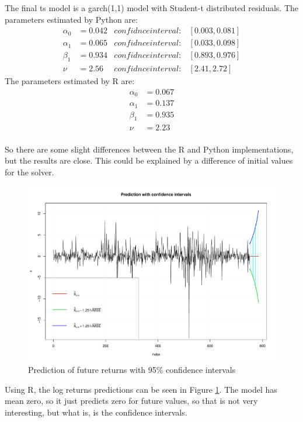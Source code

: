 The final \acrshort{ts} model is a \acrshort{garch}(1,1) model with Student-t distributed residuals. The parameters estimated by Python are:
\begin{align*}
\alpha_0 &= 0.042 & confidnce interval: & [0.003, 0.081] \\
\alpha_1 &= 0.065 & confidnce interval: & [0.033, 0.098]\\
\beta_1 &= 0.934 & confidnce interval: & [0.893, 0.976]\\
\nu &= 2.56 & confidnce interval: & [2.41, 2.72]
\end{align*}
The parameters estimated by R are:
\begin{align*}
\alpha_0 &= 0.067 \\
\alpha_1 &= 0.137 \\
\beta_1 &= 0.935 \\
\nu &= 2.23 \\
\end{align*}

So there are some slight differences between the R and Python implementations, but the results are close. This could be explained by a difference of initial values for the solver.

\begin{figure}
	\centering
	\includegraphics[width=\textwidth]{img/TSpred_ci.pdf}
	\caption{Prediction of future returns with 95\% confidence intervals}
	\label{fig:garch_pred}
\end{figure}

Using R, the log returns predictions can be seen in Figure \ref{fig:garch_pred}. The model has mean zero, so it just predicts zero for future values, so that is not very interesting, but what is, is the confidence intervals. 



